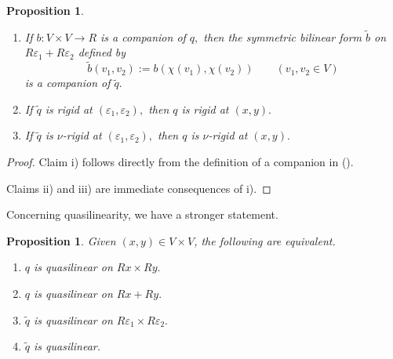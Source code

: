 \documentclass [12pt,a4paper,reqno]{amsart}
\newtheorem{prop}[thm]{Proposition}
\begin{document}
\begin{prop}\label{prop:II.5.3}
\quad{}

\begin{enumerate}\item[i)] If $b:V\times V\to R$ is a companion of
$q,$ then the symmetric bilinear form ${\tilde b}$ on
$R{\varepsilon}_1+R{\varepsilon}_2$ defined by \begin{equation}\label{eq:II.5.4}
{\tilde b}(v_1,v_2):=b(\chi(v_1),\chi(v_2)) \qquad (v_1,v_2\in V) \end{equation} is a
companion of ${\tilde q} .$
{\vskip 1.5mm \noindent}

\item[ii)] If ${\tilde q} $ is rigid at
$({\varepsilon}_1,{\varepsilon}_2),$ then $q$ is rigid at $(x,y).$

{\vskip 1.5mm \noindent}
\item[iii)] If ${\tilde q} $ is $\nu$-rigid at
$({\varepsilon}_1,{\varepsilon}_2),$ then $q$ is $\nu$-rigid at $(x,y).$
\end{enumerate}
\end{prop}

\begin{proof} Claim i) follows directly from the definition of a
companion in {\cite[~\S{{1}}]{QF1}} ({\cite[Definition~{{1.14}}]{QF1}}).

Claims ii) and iii) are immediate consequences of i).\end{proof}

Concerning quasilinearity, we have a stronger statement.

\begin{prop}\label{prop:II.5.4} Given $(x,y)\in V\times V$, the
following are equivalent.
\begin{enumerate} {{}} \item $q$ is quasilinear on $Rx \times Ry.$
{\vskip 1.5mm \noindent}

\item$q$ is quasilinear on $Rx+Ry.$
{\vskip 1.5mm \noindent}

\item
${\tilde q} $ is quasilinear on   $ R {\varepsilon}_1 \times R {\varepsilon}_2.$
{\vskip 1.5mm \noindent}

\item ${\tilde q} $ is quasilinear.
\end{enumerate}\end{prop}
\end{document}

